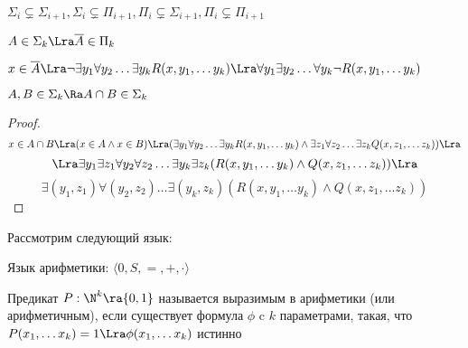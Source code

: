 \begin{theorem}[б/д]
    \(\Sigma_i \subsetneq \Sigma_{i + 1}, \Sigma_i \subsetneq \Pi_{i + 1}, \Pi_i \subsetneq \Sigma_{i + 1}, \Pi_i \subsetneq \Pi_{i + 1}\)
\end{theorem}

\begin{proposition}
    \(A \in \Sigma_k \Lra \overline{A} \in \Pi_k\)
\end{proposition}
\begin{proposition}
    \(x \in \overline{A} \Lra \neg \exists y_1 \forall y_2 \dots \exists y_k R(x, y_1, \dots y_k) \Lra \forall y_1 \exists y_2 \dots \forall y_k \neg R(x, y_1, \dots y_k)\)
\end{proposition}

\begin{proposition}
    \(A, B \in \Sigma_k \Ra A \cap B \in \Sigma_k\)
\end{proposition}
\begin{proof}\indent
    \[x \in A \cap B \Lra (x \in A \wedge x \in B) \Lra (\exists y_1 \forall y_2 \dots \exists y_k R(x, y_1, \dots y_k) \wedge \exists z_1 \forall z_2 \dots \exists z_k Q(x, z_1, \dots z_k)) \Lra \]
    \[\Lra \exists y_1\exists z_1 \forall y_2 \forall z_2 \dots \exists y_k \exists z_k (R(x, y_1, \dots y_k) \wedge Q(x, z_1, \dots z_k)) \Lra\]
    \[\exists (y_1, z_1) \forall (y_2, z_2) \dots \exists (y_k, z_k) (R(x, y_1, \dots y_k) \wedge Q(x, z_1, \dots z_k))\]
\end{proof}

Рассмотрим следующий язык:
\begin{definition}
    Язык арифметики: \(\langle0, S, =, +, \cdot\rangle\)
\end{definition}

\begin{definition}
    Предикат \(P: \N^k \ra \{0, 1\}\) называется выразимым в арифметики (или арифметичным), если существует формула \(\phi\) c \(k\) параметрами, такая, что \(P(x_1, \dots x_k) = 1 \Lra \phi(x_1, \dots x_k)\) истинно
\end{definition}

